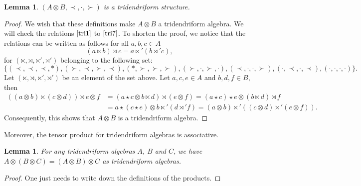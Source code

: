 \documentclass[pdftex]{sigma}
\numberwithin{equation}{section}
\theoremstyle{definition}
\theoremstyle{plain}
\newtheorem{Lemme}[defi]{Lemma}
\begin{document}
 \begin{Lemme}\label{lem:tritens}
 	$(A\otimes B,\prec,\cdot,\succ)$ is a tridendriform structure.
 \end{Lemme}
\begin{proof}
 We wish that these definitions make $A\otimes B$ a tridendriform algebra.
 We will check the relations $\eqref{tri1}$ to $\eqref{tri7}$.
 To shorten the proof, we notice that the relations can be written as follows for all $a,b,c\in A$
 \begin{equation*}
 	(a\ltimes b)\rtimes c = a\ltimes' (b\rtimes' c),
 \end{equation*}
 for $(\ltimes, \rtimes, \ltimes', \rtimes')$ belonging to the following set:
 \begin{equation} 	
 	\{ (\prec,\prec, \prec,*),(\succ,\prec,\succ,\prec),(*,\succ,\succ,\succ),(\succ,\cdot,\succ,\cdot),(\prec,\cdot, \cdot,\succ),(\cdot, \prec,\cdot, \prec),(\cdot,\cdot,\cdot,\cdot) \}. \label{quadru}
 \end{equation}
 Let $(\ltimes,\rtimes,\ltimes',\rtimes')$ be an element of the set above. Let $a,c,e\in A$ and $b,d,f\in B$, then
 \begin{align*}
 	((a\otimes b) \ltimes (c\otimes d))\rtimes e\otimes f &=(a\star c \otimes b\ltimes d) \rtimes (e\otimes f)
 												 =(a\star c)\star e \otimes (b\ltimes d) \rtimes f \\
 												 &= a\star (c\star e) \otimes b\ltimes'(d \rtimes' f)
 												 = (a\otimes b)\ltimes'((c\otimes d) \rtimes' (e\otimes f)).
 \end{align*}
 Consequently, this shows that $A\otimes B$ is a tridendriform algebra.
 \end{proof}

Moreover, the tensor product for tridendriform algebras is associative.
 \begin{Lemme}\label{lem:tritensass}
 	For any tridendriform algebras $A$, $B$ and $C$, we have $A\otimes(B\otimes C)=(A\otimes B)\otimes C$ as tridendriform algebras.
 \end{Lemme}
\begin{proof}
One just needs to write down the definitions of the products.
 \end{proof}
\end{document}
